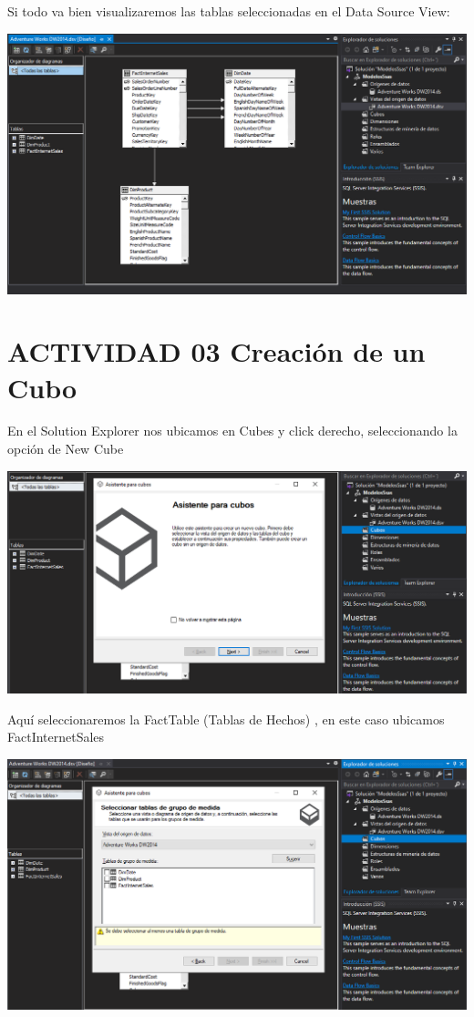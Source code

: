 Si todo va bien visualizaremos las tablas seleccionadas en el Data Source View:
	\begin{center}
	\includegraphics[width=\columnwidth]{images/task1/12}
	\end{center}	
	
\section{ACTIVIDAD 03 Creación de un Cubo}

En el Solution Explorer nos ubicamos en Cubes y click derecho, seleccionando la opción de New Cube
	\begin{center}
	\includegraphics[width=\columnwidth]{images/task1/13}
    \end{center}	
    
Aquí seleccionaremos la FactTable (Tablas de Hechos) , en este caso ubicamos FactInternetSales
	\begin{center}
	\includegraphics[width=\columnwidth]{images/task1/14}
    \end{center}	
    

